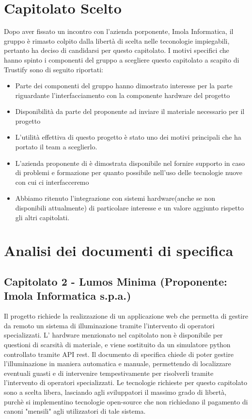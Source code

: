 \documentclass[12pt]{article}
\begin{document}
\section{Capitolato Scelto}
Dopo aver fissato un incontro con l'azienda porponente, Imola Informatica, il gruppo è rimasto colpito dalla libertà di scelta nelle teconologie impiegabili, pertanto ha deciso di candidarsi per questo capitolato.
I motivi specifici che hanno spinto i componenti del gruppo a scegliere questo capitolato a scapito di Trustify sono di seguito riportati:
\begin{itemize}
    \item Parte dei componenti del gruppo hanno dimostrato interesse per la parte riguardante l'interfacciamento con la componente hardware del progetto
    \item Disponibilità da parte del proponente ad inviare il materiale necessario per il progetto
    \item L'utilità effettiva di questo progetto è stato uno dei motivi principali che ha portato il team a sceglierlo.
    \item L'azienda proponente di è dimostrata disponibile nel fornire supporto in caso di problemi e formazione per quanto possibile nell'uso delle tecnologie nuove con cui ci interfacceremo
     \item Abbiamo ritenuto l'integrazione con sistemi hardware(anche se non disponibili attualmente) di particolare interesse e un valore aggiunto rispetto gli altri capitolati.
\end{itemize}
\section{Analisi dei documenti di specifica}
\subsection{Capitolato 2 - Lumos Minima (Proponente: Imola Informatica s.p.a.)}
    Il progetto richiede la realizzazione di un applicazione web che permetta di gestire da remoto un sistema di illuminazione tramite l'intervento di operatori specializzati. L' hardware menzionato nel capitolato non è disponibile per questioni di scarsità di materiale, e viene sostituito da un simulatore python controllato tramite API rest.
    Il documento di specifica chiede di poter gestire l'illuminazione in maniera automatica e manuale, permettendo di localizzare eventuali guasti e di intervenire tempestivamente per risolverli tramite l'intervento di operatori specializzati.
    Le tecnologie richieste per questo capitolato sono a scelta libera, lasciando agli sviluppatori il massimo grado di libertà, purchè si implementino tecnologie open-source che non richiedano il pagamento di canoni "mensili" agli utilizzatori di tale sistema.    
     
\end{document}
